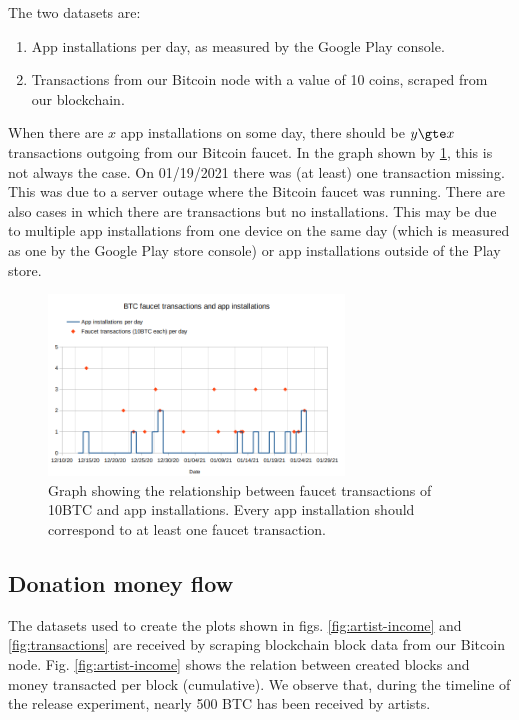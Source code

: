 The two datasets are: 
\begin{enumerate}
    \item App installations per day, as measured by the Google Play console.
    \item Transactions from our Bitcoin node with a value of 10 coins, scraped from our blockchain.
\end{enumerate}

When there are $x$ app installations on some day, there should be $y \gte x$ transactions outgoing from our Bitcoin faucet. In the graph shown by \ref{fig:faucet-app-installs}, this is not always the case. On 01/19/2021 there was (at least) one transaction missing. This was due to a server outage where the Bitcoin faucet was running. There are also cases in which there are transactions but no installations. This may be due to multiple app installations from one device on the same day (which is measured as one by the Google Play store console) or app installations outside of the Play store. 
\begin{figure}
    \centering
    \includegraphics[width=0.7\textwidth]{evaluation/faucet-app-installs.png}
    \caption{Graph showing the relationship between faucet transactions of 10BTC and app installations. Every app installation should correspond to at least one faucet transaction.}
    \label{fig:faucet-app-installs}
\end{figure}

\subsection{Donation money flow}
The datasets used to create the plots shown in figs. \ref{fig:artist-income} and \ref{fig:transactions} are received by scraping blockchain block data from our Bitcoin node. Fig. \ref{fig:artist-income} shows the relation between created blocks and money transacted per block (cumulative). We observe that, during the timeline of the release experiment, nearly 500 BTC has been received by artists.

